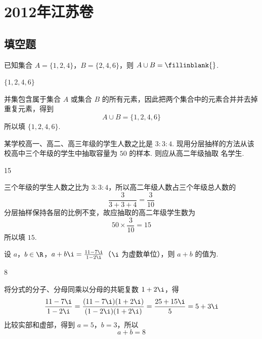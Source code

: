 \chapter{2012年江苏卷}

\section{填空题}

\begin{problem}
已知集合 \(A = \{1, 2, 4\}\)，\(B = \{2, 4, 6\}\)，则 \(A \cup B =\fillinblank{}\).
\end{problem}

\begin{answer}
\(\{1,2,4,6\}\)
\end{answer}

\begin{solution}
并集包含属于集合 \(A\) 或集合 \(B\) 的所有元素，因此把两个集合中的元素合并并去掉重复元素，得到
\[
A\cup B=\{1,2,4,6\}
\]
所以填 \(\{1,2,4,6\}\).
\end{solution}

\begin{problem}
某学校高一、高二、高三年级的学生人数之比是 \(3:3:4\). 现用分层抽样的方法从该校高中三个年级的学生中抽取容量为 \(50\) 的样本. 则应从高二年级抽取\fillinblank{} 名学生.
\end{problem}

\begin{answer}
15
\end{answer}

\begin{solution}
三个年级的学生人数之比为 \(3:3:4\)，所以高二年级人数占三个年级总人数的
\[
\frac{3}{3+3+4}=\frac{3}{10}
\]
分层抽样保持各层的比例不变，故应抽取的高二年级学生数为
\[
50\times\frac{3}{10}=15
\]
所以填 \(15\).
\end{solution}

\begin{problem}
设 \(a\)，\(b \in \R\)，\(a + b\i = \frac{11 - 7\i}{1 - 2\i}\)（\(\i\) 为虚数单位），则 \(a + b\) 的值为\fillinblank{}.
\end{problem}

\begin{answer}
8
\end{answer}

\begin{solution}
将分式的分子、分母同乘以分母的共轭复数 \(1+2\i\)，得
\[
\frac{11-7\i}{1-2\i}=\frac{(11-7\i)(1+2\i)}{(1-2\i)(1+2\i)}=\frac{25+15\i}{5}=5+3\i
\]
比较实部和虚部，得到 \(a=5\)，\(b=3\)，所以
\[
a+b=8
\]
\end{solution}

